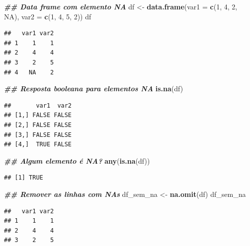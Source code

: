 \documentclass[
]{article}
\newenvironment{Shaded}{\begin{snugshade}}{\end{snugshade}}
\newcommand{\AttributeTok}[1]{\textcolor[rgb]{0.13,0.29,0.53}{#1}}
\newcommand{\ConstantTok}[1]{\textcolor[rgb]{0.56,0.35,0.01}{#1}}
\newcommand{\DecValTok}[1]{\textcolor[rgb]{0.00,0.00,0.81}{#1}}
\newcommand{\DocumentationTok}[1]{\textcolor[rgb]{0.56,0.35,0.01}{\textbf{\textit{#1}}}}
\newcommand{\FunctionTok}[1]{\textcolor[rgb]{0.13,0.29,0.53}{\textbf{#1}}}
\newcommand{\NormalTok}[1]{#1}
\newcommand{\OtherTok}[1]{\textcolor[rgb]{0.56,0.35,0.01}{#1}}
\begin{document}
\begin{Shaded}
\begin{Highlighting}[]
\DocumentationTok{\#\# Data frame com elemento NA}
\NormalTok{df }\OtherTok{\textless{}{-}} \FunctionTok{data.frame}\NormalTok{(}\AttributeTok{var1 =} \FunctionTok{c}\NormalTok{(}\DecValTok{1}\NormalTok{, }\DecValTok{4}\NormalTok{, }\DecValTok{2}\NormalTok{, }\ConstantTok{NA}\NormalTok{), }\AttributeTok{var2 =} \FunctionTok{c}\NormalTok{(}\DecValTok{1}\NormalTok{, }\DecValTok{4}\NormalTok{, }\DecValTok{5}\NormalTok{, }\DecValTok{2}\NormalTok{))}
\NormalTok{df}
\end{Highlighting}
\end{Shaded}

\begin{verbatim}
##   var1 var2
## 1    1    1
## 2    4    4
## 3    2    5
## 4   NA    2
\end{verbatim}

\begin{Shaded}
\begin{Highlighting}[]
\DocumentationTok{\#\# Resposta booleana para elementos NA}
\FunctionTok{is.na}\NormalTok{(df)}
\end{Highlighting}
\end{Shaded}

\begin{verbatim}
##       var1  var2
## [1,] FALSE FALSE
## [2,] FALSE FALSE
## [3,] FALSE FALSE
## [4,]  TRUE FALSE
\end{verbatim}

\begin{Shaded}
\begin{Highlighting}[]
\DocumentationTok{\#\# Algum elemento é NA?}
\FunctionTok{any}\NormalTok{(}\FunctionTok{is.na}\NormalTok{(df))}
\end{Highlighting}
\end{Shaded}

\begin{verbatim}
## [1] TRUE
\end{verbatim}

\begin{Shaded}
\begin{Highlighting}[]
\DocumentationTok{\#\# Remover as linhas com NAs}
\NormalTok{df\_sem\_na }\OtherTok{\textless{}{-}} \FunctionTok{na.omit}\NormalTok{(df)}
\NormalTok{df\_sem\_na}
\end{Highlighting}
\end{Shaded}

\begin{verbatim}
##   var1 var2
## 1    1    1
## 2    4    4
## 3    2    5
\end{verbatim}
\end{document}
